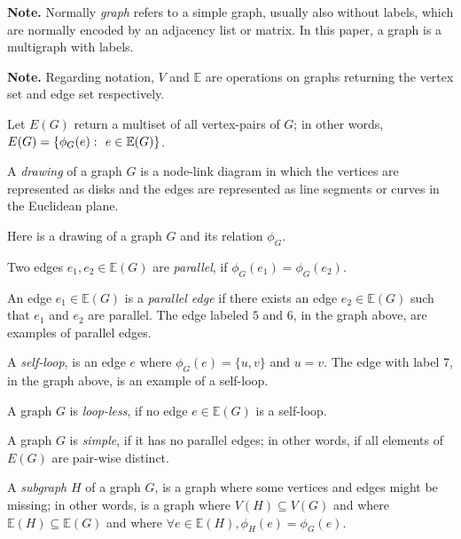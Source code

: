 \documentclass{article}
\begin{document}
	\textbf{Note.} Normally \textit{graph} refers to a simple graph, usually also without labels, which are normally encoded by an adjacency list or matrix. In this paper, a graph is a multigraph with labels.

	\textbf{Note.} Regarding notation, $V$ and $\mathbb{E}$ are operations on graphs returning the vertex set and edge set respectively.

	Let $E(G)$ return a multiset of all vertex-pairs of $G$; in other words, $E(G) = \{\phi_G(e) \,\colon\  e \in \mathbb{E}(G)\}$.

	A \textit{drawing} of a graph $G$ is a node-link diagram in which the vertices are represented as disks and the edges are represented as line segments or curves in the Euclidean plane.

	Here is a drawing of a graph $G$ and its relation $\phi_G$.

	\begin{center}
		
	\end{center}

	Two edges $e_1,e_2 \in \mathbb{E}(G)$ are \textit{parallel}, if $\phi_G(e_1) = \phi_G(e_2)$.

	An edge $e_1 \in \mathbb{E}(G)$ is a \textit{parallel edge} if there exists an edge $e_2 \in \mathbb{E}(G)$ such that $e_1$ and $e_2$ are parallel. The edge labeled $5$ and $6$, in the graph above, are examples of parallel edges.

	A \textit{self-loop}, is an edge $e$ where $\phi_G(e) = \{u,v\}$ and $u = v$. The edge with label 7, in the graph above, is an example of a self-loop.

	A graph $G$ is \textit{loop-less}, if no edge $e \in \mathbb{E}(G)$ is a self-loop.

	A graph $G$ is \textit{simple}, if it has no parallel edges; in other words, if all elements of $E(G)$ are pair-wise distinct.

	\begin{center}
		
	\end{center}

	A \textit{subgraph} $H$ of a graph $G$, is a graph where some vertices and edges might be missing; in other words, is a graph where $V(H) \subseteq V(G)$ and where $\mathbb{E}(H) \subseteq \mathbb{E}(G)$ and where $\forall e \in \mathbb{E}(H), \phi_H(e) = \phi_G(e)$.

	\begin{center}
		
	\end{center}
\end{document}
